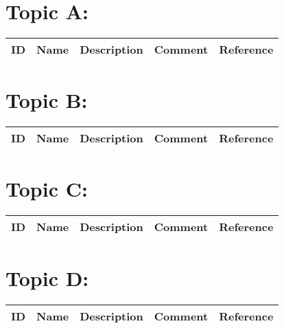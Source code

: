 
\section{Topic A:}

\begin{table}[H]\centering
\begin{tabular}{p{1cm}p{2cm}p{3cm}p{3cm}p{1cm}}
ID & Name & Description & Comment & Reference \\
\hline
\hline
\end{tabular}
\end{table}

\section{Topic B:}

\begin{table}[H]\centering
\begin{tabular}{p{1cm}p{2cm}p{3cm}p{3cm}p{1cm}}
ID & Name & Description & Comment & Reference \\
\hline
\hline
\end{tabular}
\end{table}

\section{Topic C:}

\begin{table}[H]\centering
\begin{tabular}{p{1cm}p{2cm}p{3cm}p{3cm}p{1cm}}
ID & Name & Description & Comment & Reference \\
\hline
\hline
\end{tabular}
\end{table}

\section{Topic D:}

\begin{table}[H]\centering
\begin{tabular}{p{1cm}p{2cm}p{3cm}p{3cm}p{1cm}}
ID & Name & Description & Comment & Reference \\
\hline
\hline
\end{tabular}
\end{table}


